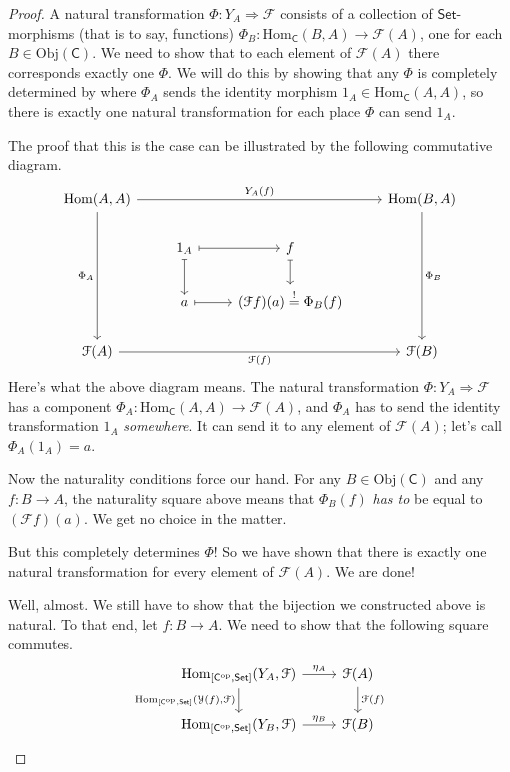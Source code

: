 \documentclass[a4paper,10pt]{scrreprt}
\newcommand{\Obj}{\mathrm{Obj}}
\newcommand{\Hom}{\mathrm{Hom}}
\theoremstyle{definition}
\theoremstyle{plain}
\theoremstyle{remark}
\begin{document}
\begin{proof}
  A natural transformation $\Phi\colon Y_{A} \Rightarrow \mathcal{F}$ consists of a collection of $\mathsf{Set}$-morphisms (that is to say, functions) $\Phi_{B}\colon \Hom_{\mathsf{C}}(B, A) \to \mathcal{F}(A)$, one for each $B \in \Obj(\mathsf{C})$. We need to show that to each element of $\mathcal{F}(A)$ there corresponds exactly one $\Phi$. We will do this by showing that any $\Phi$ is completely determined by where $\Phi_{A}$ sends the identity morphism $1_{A} \in \Hom_{\mathsf{C}}(A, A)$, so there is exactly one natural transformation for each place $\Phi$ can send $1_{A}$.

  The proof that this is the case can be illustrated by the following commutative diagram.
  \begin{equation*}
    \begin{tikzcd}
      \Hom(A, A)
      \arrow[rrr, "Y_{A}(f)"]
      \arrow[ddd, swap, "\Phi_{A}"]
      & & & \Hom(B, A)
      \arrow[ddd, "\Phi_{B}"]
      \\
      & 1_{A}
      \arrow[r, mapsto]
      \arrow[d, mapsto]
      & f
      \arrow[d, mapsto]
      \\
      & a
      \arrow[r, mapsto]
      & (\mathcal{F}f)(a) \stackrel{!}{=} \Phi_{B}(f) 
      \\
      \mathcal{F}(A)
      \arrow[rrr, swap, "\mathcal{F}(f)"]
      & & & \mathcal{F}(B)
    \end{tikzcd}
  \end{equation*}
  Here's what the above diagram means. The natural transformation $\Phi\colon Y_{A} \Rightarrow \mathcal{F}$ has a component $\Phi_{A}\colon \Hom_{\mathsf{C}}(A, A) \to \mathcal{F}(A)$, and $\Phi_{A}$ has to send the identity transformation $1_{A}$ \emph{somewhere}. It can send it to any element of $\mathcal{F}(A)$; let's call $\Phi_{A}(1_{A}) = a$.

  Now the naturality conditions force our hand. For any $B \in \Obj(\mathsf{C})$ and any $f\colon B \to A$, the naturality square above means that $\Phi_{B}(f)$ \emph{has to} be equal to $(\mathcal{F}f)(a)$. We get no choice in the matter.

  But this completely determines $\Phi$! So we have shown that there is exactly one natural transformation for every element of $\mathcal{F}(A)$. We are done!

  Well, almost. We still have to show that the bijection we constructed above is natural. To that end, let $f\colon B \to A$. We need to show that the following square commutes.
  \begin{equation*}
    \begin{tikzcd}
      \Hom_{[\mathsf{C}^{\text{op}}, \mathsf{Set}]}(Y_{A}, \mathcal{F})
      \arrow[r, "\eta_{A}"]
      \arrow[d, swap, "{\Hom_{[\mathsf{C}^{\text{op}}, \mathsf{Set}]}(\mathcal{Y}(f), \mathcal{F})}"]
      & \mathcal{F}(A)
      \arrow[d, "\mathcal{F}(f)"]
      \\
      \Hom_{[\mathsf{C}^{\text{op}}, \mathsf{Set}]}(Y_{B}, \mathcal{F})
      \arrow[r, "\eta_{B}"]
      & \mathcal{F}(B)
    \end{tikzcd}
  \end{equation*}


\end{proof}
\end{document}
